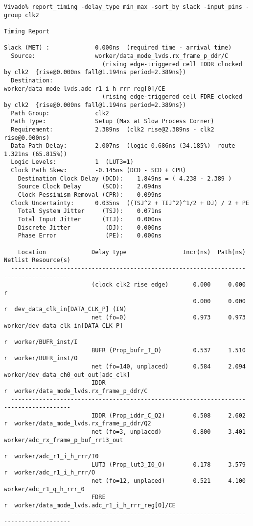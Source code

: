\documentclass{article}
\begin{document}
\begin{lstlisting}
Vivado% report_timing -delay_type min_max -sort_by slack -input_pins -group clk2

Timing Report

Slack (MET) :             0.000ns  (required time - arrival time)
  Source:                 worker/data_mode_lvds.rx_frame_p_ddr/C
                            (rising edge-triggered cell IDDR clocked by clk2  {rise@0.000ns fall@1.194ns period=2.389ns})
  Destination:            worker/data_mode_lvds.adc_r1_i_h_rrr_reg[0]/CE
                            (rising edge-triggered cell FDRE clocked by clk2  {rise@0.000ns fall@1.194ns period=2.389ns})
  Path Group:             clk2
  Path Type:              Setup (Max at Slow Process Corner)
  Requirement:            2.389ns  (clk2 rise@2.389ns - clk2 rise@0.000ns)
  Data Path Delay:        2.007ns  (logic 0.686ns (34.185%)  route 1.321ns (65.815%))
  Logic Levels:           1  (LUT3=1)
  Clock Path Skew:        -0.145ns (DCD - SCD + CPR)
    Destination Clock Delay (DCD):    1.849ns = ( 4.238 - 2.389 )
    Source Clock Delay      (SCD):    2.094ns
    Clock Pessimism Removal (CPR):    0.099ns
  Clock Uncertainty:      0.035ns  ((TSJ^2 + TIJ^2)^1/2 + DJ) / 2 + PE
    Total System Jitter     (TSJ):    0.071ns
    Total Input Jitter      (TIJ):    0.000ns
    Discrete Jitter          (DJ):    0.000ns
    Phase Error              (PE):    0.000ns

    Location             Delay type                Incr(ns)  Path(ns)    Netlist Resource(s)
  -------------------------------------------------------------------    -------------------
                         (clock clk2 rise edge)       0.000     0.000 r
                                                      0.000     0.000 r  dev_data_clk_in[DATA_CLK_P] (IN)
                         net (fo=0)                   0.973     0.973    worker/dev_data_clk_in[DATA_CLK_P]
                                                                      r  worker/BUFR_inst/I
                         BUFR (Prop_bufr_I_O)         0.537     1.510 r  worker/BUFR_inst/O
                         net (fo=140, unplaced)       0.584     2.094    worker/dev_data_ch0_out_out[adc_clk]
                         IDDR                                         r  worker/data_mode_lvds.rx_frame_p_ddr/C
  -------------------------------------------------------------------    -------------------
                         IDDR (Prop_iddr_C_Q2)        0.508     2.602 r  worker/data_mode_lvds.rx_frame_p_ddr/Q2
                         net (fo=3, unplaced)         0.800     3.401    worker/adc_rx_frame_p_buf_rr13_out
                                                                      r  worker/adc_r1_i_h_rrr/I0
                         LUT3 (Prop_lut3_I0_O)        0.178     3.579 r  worker/adc_r1_i_h_rrr/O
                         net (fo=12, unplaced)        0.521     4.100    worker/adc_r1_q_h_rrr_0
                         FDRE                                         r  worker/data_mode_lvds.adc_r1_i_h_rrr_reg[0]/CE
  -------------------------------------------------------------------    -------------------


\end{lstlisting}
\end{document}
